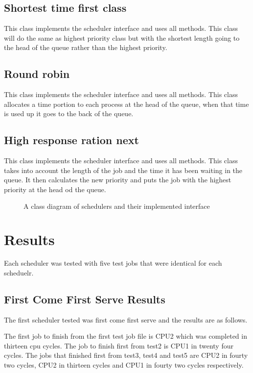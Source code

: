 \documentclass{acm_proc_article-sp}
\begin{document}
\subsection{Shortest time first class}
This class implements the scheduler interface and uses all methods. This class will do the same as highest priority class but with the shortest length going to the head of the queue rather than the highest priority.

\subsection{Round robin}
This class implements the scheduler interface and uses all methods. This class allocates a time portion to each process at the head of the queue, when that time is used up it goes to the back of the queue.

\subsection{High response ration next}
This class implements the scheduler interface and uses all methods. This class takes into account the length of the job and the time it has been waiting in the queue. It then calculates the new priority and puts the job with the highest priority at the head od the queue.

\begin{figure}
\centering
{}
\caption{A class diagram of schedulers and their implemented interface}
\end{figure}



\section{Results}
Each scheduler was tested with five test jobs that were identical for each scheduelr.
\subsection{First Come First Serve Results}
The first scheduler tested was first come first serve and the results are as follows.

The first job to finish from the first test job file is CPU2 which was completed in thirteen cpu cycles. The job to finish first from test2 is CPU1 in twenty four cycles. The jobs that finished first from test3, test4 and test5 are CPU2 in fourty two cycles, CPU2 in thirteen cycles and CPU1 in fourty two cycles respectively. 
\end{document}
